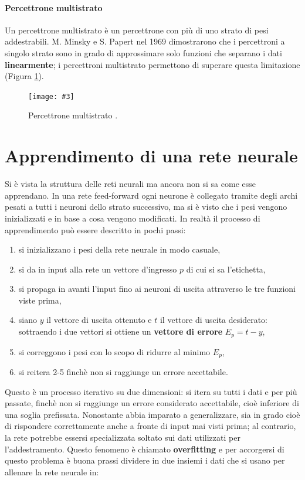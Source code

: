 \documentclass[12pt, twoside, letterpaper]{report}
\newcommand{\img}[4] {
	\begin{figure}
		\centering
		\texttt{[image: \#3]}\\
		\caption{#1}
		\label{fig:#4}
	\end{figure}
}
\begin{document}
			\paragraph{Percettrone multistrato} Un percettrone multistrato è un percettrone con più di uno strato di pesi addestrabili. M. Minsky e S. Papert nel 1969 \cite{minsky_papert} dimostrarono che i percettroni a singolo strato sono in grado di approssimare solo funzioni che separano i dati \textbf{linearmente}; i percettroni multistrato permettono di superare questa limitazione (Figura \ref{fig:feedforward}). 
				\img{Percettrone multistrato \cite{kriesel}.}{0.5}{nn-feed-forward.png}{feedforward}
		
		\section{Apprendimento di una rete neurale}
			Si è vista la struttura delle reti neurali ma ancora non si sa come esse apprendano. In una rete feed-forward ogni neurone è collegato tramite degli archi pesati a tutti i neuroni dello strato successivo, ma si è visto che i pesi vengono inizializzati e in base a cosa vengono modificati. In realtà il processo di apprendimento può essere descritto in pochi passi: 
			\begin{enumerate}
				\item si inizializzano i pesi della rete neurale in modo casuale,
				\item si da in input alla rete un vettore d'ingresso $p$ di cui si sa l'etichetta,
				\item si propaga in avanti l'input fino ai neuroni di uscita attraverso le tre funzioni viste prima, 
				\item siano $y$ il vettore di uscita ottenuto e $t$ il vettore di uscita desiderato: sottraendo i due vettori si ottiene un \textbf{vettore di errore} $E_p = t - y$,
				\item si correggono i pesi con lo scopo di ridurre al minimo $E_p$,
				\item si reitera 2-5 finchè non si raggiunge un errore accettabile.
			\end{enumerate}
			Questo è un processo iterativo su due dimensioni: si itera su tutti i dati e per più passate, finchè non si raggiunge un errore considerato accettabile, cioè inferiore di una soglia prefissata. Nonostante abbia imparato a generalizzare, sia in grado cioè di rispondere correttamente anche a fronte di input mai visti prima; al contrario, la rete potrebbe essersi specializzata soltato sui dati utilizzati per l'addestramento. Questo fenomeno è chiamato \textbf{overfitting} e per accorgersi di questo problema è buona prassi dividere in due insiemi i dati che si usano per allenare la rete neurale in: 
\end{document}
